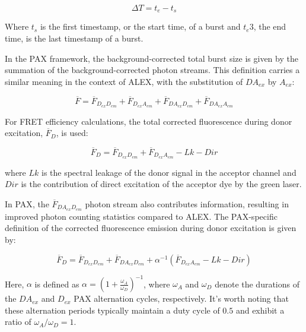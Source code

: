 \begin{equation}
\label{eqn:burst_def}
\Delta T = t_e - t_s
\end{equation}

\noindent
Where $t_s$ is the first timestamp, or the start time, of a burst and $t_e3$, the end time, is the last timestamp of a burst.

In the \ac{PAX} framework, the background-corrected total burst size is given by the summation of the background-corrected photon streams. 
This definition carries a similar meaning in the context of \ac{ALEX}, with the substitution of $DA_{ex}$ by $A_{ex}$:

\begin{equation}
\label{eqn:burst_size}
\overline{F} = \overline{F}_{D_{ex}D_{em}} + \overline{F}_{D_{ex}A_{em}} +\overline{F}_{DA_{ex}D_{em}} + \overline{F}_{DA_{ex}A_{em}}
\end{equation}

\noindent
For FRET efficiency calculations, the total corrected fluorescence during donor excitation, $\overline{F}_D$, is used: 

\begin{equation}
\label{eqn:total_Fd}
\overline{F}_D = \overline{F}_{D_{ex}D_{em}}+\overline{F}_{D_{ex}A_{em}} - Lk - Dir
\end{equation}

\noindent
where $Lk$ is the spectral leakage of the donor signal in the
acceptor channel and $Dir$ is the contribution of direct
excitation of the acceptor dye by the green laser. 

In \ac{PAX}, the $\overline{F}_{DA_{ex}D_{em}}$ photon stream 
also contributes information, resulting in improved photon counting statistics
compared to \ac{ALEX}. 
The \ac{PAX}-specific definition of the corrected fluorescence emission
during donor excitation is given by:

\begin{equation}
\label{eqn:corr_total_Fd}
\overline{F}_{D} = \overline{F}_{D_{ex}D_{em}} + \overline{F}_{DA_{ex}D_{em}} + \alpha^{-1}(\overline{F}_{D_{ex}A_{em}} - Lk - Dir)
\end{equation}

\noindent

Here, $\alpha$ is defined as $\alpha = \left(1 + \frac{\omega_A}{\omega_D}\right)^{-1}$, where $\omega_A$ and $\omega_D$ denote the durations of the $DA_{ex}$ and $D_{ex}$ \ac{PAX} alternation cycles, respectively. 
It's worth noting that these alternation periods typically maintain a duty cycle of $0.5$ and exhibit a ratio of $\omega_A / \omega_D = 1$.

